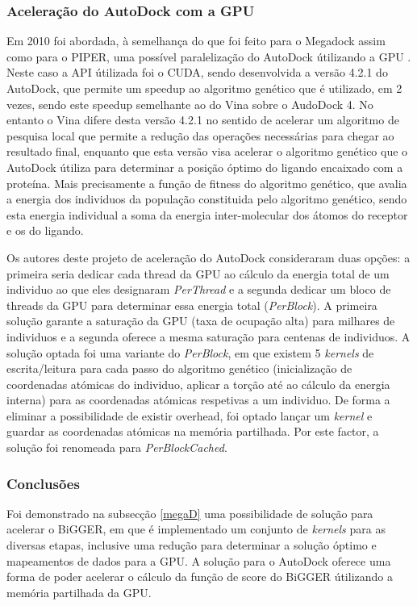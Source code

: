 \subsubsection{Aceleração do AutoDock com a GPU}
 Em 2010 foi abordada, à semelhança do que foi feito para o Megadock assim como para o PIPER, uma possível paralelização do AutoDock útilizando a GPU \cite{autodockCuda}. Neste caso a API útilizada foi o CUDA, sendo desenvolvida a versão 4.2.1 do AutoDock, que permite um speedup ao algoritmo genético que é utilizado, em 2 vezes, sendo este speedup semelhante ao do Vina sobre o AudoDock 4.  No entanto o Vina difere desta versão 4.2.1 no sentido de acelerar um algoritmo de pesquisa local que permite a redução das operações necessárias para chegar ao resultado final, enquanto que esta versão visa acelerar o algoritmo genético que o AutoDock útiliza para determinar a posição óptimo do ligando encaixado com a proteína. Mais precisamente a função de fitness do algoritmo genético, que avalia a energia dos individuos da população constituida pelo algoritmo genético, sendo esta energia individual a soma da energia inter-molecular dos átomos do receptor e os do ligando.

Os autores deste projeto de aceleração do AutoDock consideraram duas opções: a primeira seria dedicar cada thread da GPU ao cálculo da energia total de um individuo ao que eles designaram  \textit{PerThread} e a segunda dedicar um bloco de threads da GPU para determinar essa energia total (\textit{PerBlock}). A primeira solução garante a saturação da GPU (taxa de ocupação alta) para milhares de individuos e a segunda oferece a mesma saturação para centenas de individuos.
A solução optada foi uma variante do \textit{PerBlock}, em que existem 5 \textit{kernels} de escrita/leitura para cada passo do algoritmo genético (inicialização de coordenadas atómicas do individuo, aplicar a torção até ao cálculo da energia interna) para as coordenadas atómicas respetivas a um individuo. De forma a eliminar a possibilidade de existir overhead, foi optado lançar um \textit{kernel} e guardar as coordenadas atómicas na memória partilhada. Por este factor, a solução foi renomeada para \textit{PerBlockCached}.
 \subsubsection{Conclusões}
 Foi demonstrado na subsecção \ref{megaD} uma possibilidade de solução para acelerar o BiGGER, em que é implementado um conjunto de \textit{kernels} para as diversas etapas, inclusive uma redução para determinar a solução óptimo e mapeamentos de dados para a GPU. A solução para o AutoDock oferece uma forma de poder acelerar o cálculo da função de score do BiGGER útilizando a memória partilhada da GPU. 
 
